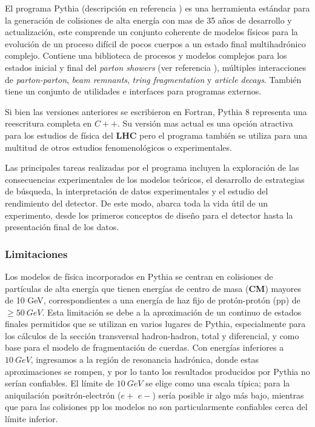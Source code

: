 
El programa Pythia (descripción en referencia \cite{sjostrand_introduction_2015}) es una herramienta estándar para la generación de colisiones de alta energía con mas de 35 a\~nos de desarrollo y actualización, este comprende un conjunto coherente de modelos físicos para la evolución de un proceso difícil de pocos cuerpos a un estado final multihadrónico complejo. Contiene una biblioteca de procesos y modelos complejos para los estados inicial y final del \textit{parton showers} (ver referencia \cite{nagy_what_2018}), múltiples interacciones de \textit{parton-parton}, \textit{beam remnants}, \textit{tring fragmentation} y \textit{article decays}. También tiene un conjunto de utilidades e interfaces para programas externos.  

Si bien las versiones anteriores se escribieron en Fortran, Pythia 8 representa una reescritura completa en $C ++$. Su versión mas actual es una opción atractiva para los estudios de física del \textbf{LHC} pero el programa también se utiliza para una multitud de otros estudios fenomenológicos o experimentales.

Las principales tareas realizadas por el programa incluyen la exploración de las consecuencias experimentales de los modelos teóricos, el desarrollo de estrategias de búsqueda, la interpretación de datos experimentales y el estudio del rendimiento del detector. De este modo, abarca toda la vida útil de un experimento, desde los primeros conceptos de diseño para el detector hasta la presentación final de los datos. %

\subsubsection{Limitaciones}

Los modelos de física incorporados en Pythia se centran en colisiones de partículas de alta energía que tienen energías de centro de masa (\textbf{CM}) mayores de 10 GeV, correspondientes a una energía de haz fijo de protón-protón (pp) de $\geq 50~GeV$. Esta limitación se debe a la aproximación de un continuo de estados finales permitidos que se utilizan en varios lugares de Pythia, especialmente para los cálculos de la sección transversal hadron-hadron, total y diferencial, y como base para el modelo de fragmentación de cuerdas. Con energías inferiores a $10~GeV$, ingresamos a la región de resonancia hadrónica, donde estas aproximaciones se rompen, y por lo tanto los resultados producidos por Pythia no serían confiables. El límite de $10~GeV$ se elige como una escala típica; para la aniquilación positrón-electrón ($e+$ $e-$) sería posible ir algo más bajo, mientras que para las colisiones pp los modelos no son particularmente confiables cerca del límite inferior.

